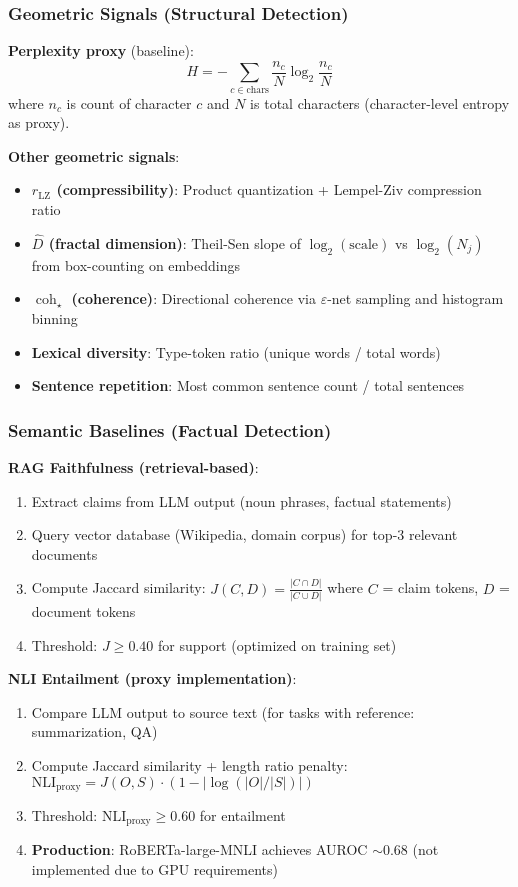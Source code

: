 \documentclass[11pt]{article}
\begin{document}
\subsubsection{Geometric Signals (Structural Detection)}

\textbf{Perplexity proxy} (baseline):
\begin{equation}
H = -\sum_{c \in \text{chars}} \frac{n_c}{N} \log_2 \frac{n_c}{N}
\end{equation}
where $n_c$ is count of character $c$ and $N$ is total characters (character-level entropy as proxy).

\textbf{Other geometric signals}:
\begin{itemize}
\item \textbf{$r_{\text{LZ}}$ (compressibility)}: Product quantization + Lempel-Ziv compression ratio
\item \textbf{$\hat{D}$ (fractal dimension)}: Theil-Sen slope of $\log_2(\text{scale})$ vs $\log_2(N_j)$ from box-counting on embeddings
\item \textbf{$\operatorname{coh}_\star$ (coherence)}: Directional coherence via $\varepsilon$-net sampling and histogram binning
\item \textbf{Lexical diversity}: Type-token ratio (unique words / total words)
\item \textbf{Sentence repetition}: Most common sentence count / total sentences
\end{itemize}

\subsubsection{Semantic Baselines (Factual Detection)}

\textbf{RAG Faithfulness (retrieval-based)}:
\begin{enumerate}
\item Extract claims from LLM output (noun phrases, factual statements)
\item Query vector database (Wikipedia, domain corpus) for top-3 relevant documents
\item Compute Jaccard similarity: $J(C, D) = \frac{|C \cap D|}{|C \cup D|}$ where $C$ = claim tokens, $D$ = document tokens
\item Threshold: $J \geq 0.40$ for support (optimized on training set)
\end{enumerate}

\textbf{NLI Entailment (proxy implementation)}:
\begin{enumerate}
\item Compare LLM output to source text (for tasks with reference: summarization, QA)
\item Compute Jaccard similarity + length ratio penalty: $\text{NLI}_{\text{proxy}} = J(O, S) \cdot (1 - |\log(|O|/|S|)|)$
\item Threshold: $\text{NLI}_{\text{proxy}} \geq 0.60$ for entailment
\item \textbf{Production}: RoBERTa-large-MNLI achieves AUROC $\sim$0.68 (not implemented due to GPU requirements)
\end{enumerate}
\end{document}
